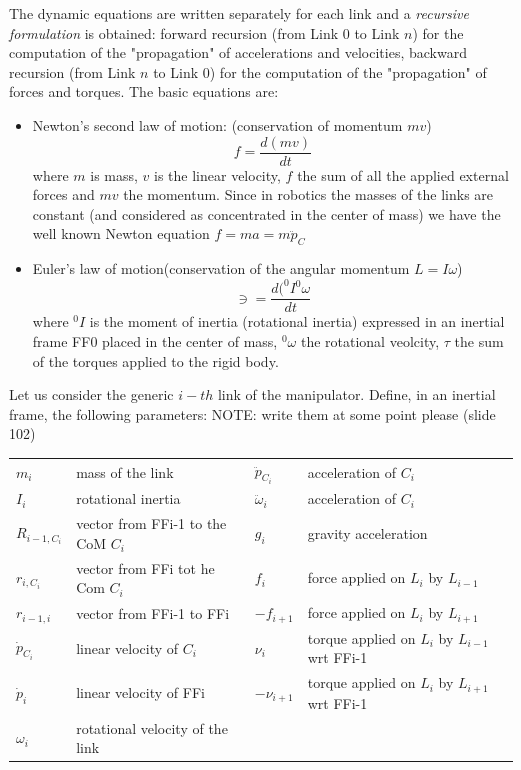 \documentclass{book}
\begin{document}
The dynamic equations are written separately for each link and a \emph{recursive formulation} is obtained: forward recursion (from Link 0 to Link $n$) for the computation of the "propagation" of accelerations and velocities, backward recursion (from Link $n$ to Link 0) for the computation of the "propagation" of forces and torques. The basic equations are:
\begin{itemize}
    \item Newton's second law of motion: (conservation of momentum $mv$)
        \[
            f= \frac{d(mv)}{dt}
        \]
        where $m$ is mass, $v$ is the linear velocity, $f$ the sum of all the applied external forces and $mv$ the momentum. Since in robotics the masses of the links are constant (and considered as concentrated in the center of mass) we have the well known Newton equation $f=ma=m\ddot{p}_C$
    \item Euler's law of motion(conservation of the angular momentum $L=I\omega$)
        \[
            \ni = \frac{d(^0I^0\omega}{dt}
        \]
        where $^0I$ is the moment of inertia (rotational inertia) expressed in an inertial frame FF0 placed in the center of mass, $^0\omega$ the rotational veolcity, $\tau$ the sum of the torques applied to the rigid body.
\end{itemize}
Let us consider the generic $i-th$ link of the manipulator. Define, in an inertial frame, the following parameters: NOTE: write them at some point please (slide 102)
\begin{tabular}{ l l | l l }
    $m_i$ & mass of the link & $\ddot{p}_{C_i}$ & acceleration of $C_i$\\
    $I_i$ & rotational inertia & $\ddot{\omega}_i$ & acceleration of $C_i$\\
    $R_{i-1,C_i}$ & vector from FFi-1 to the CoM $C_i$ & $g_i$ & gravity acceleration \\
    $r_{i,C_i}$ & vector from FFi tot he Com $C_i$ & $f_i$ & force applied on $L_i$ by $L_{i-1} $\\
    $r_{i-1,i}$ & vector from FFi-1 to FFi & $-f_{i+1}$ & force applied on $L_i$ by $L_{i+1}$ \\
    $\dot{p}_{C_i}$ & linear velocity of $C_i$ & $\nu_i$ & torque applied on $L_i$ by $L_{i-1}$ wrt FFi-1 \\
    $\dot{p}_i$ & linear velocity of FFi & $-\nu_{i+1}$ &torque applied on $L_i$ by $L_{i+1}$ wrt FFi-1\\
    $\omega_i$ & rotational velocity of the link &  & 
\end{tabular}
\end{document}
